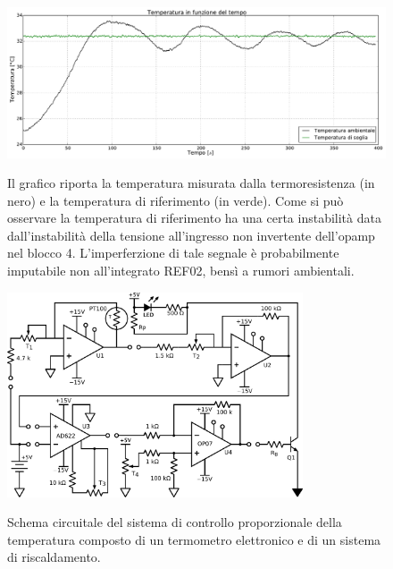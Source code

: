 \begin{figure}[ht]
 \centering
   {\includegraphics[width=1\textwidth]{../E06/latex/grafico.pdf}}
 \caption{Il grafico riporta la temperatura misurata dalla termoresistenza (in nero) e la temperatura di riferimento (in verde). Come si può osservare la temperatura di riferimento ha una certa instabilità data dall'instabilità della tensione all'ingresso non invertente dell'opamp nel blocco 4. L'imperferzione di tale segnale è probabilmente imputabile non all'integrato REF02, bensì a rumori ambientali.}
 \label{gr6:grafico}
\end{figure}

\begin{figure}[htc!]
 \centering
   {\includegraphics[width=0.78\textwidth]{../E06/latex/c2.pdf}}%
 \caption{Schema circuitale del sistema di controllo proporzionale della temperatura composto di un termometro elettronico e di un sistema di riscaldamento.}
 \label{gr6:proporzionale}
\end{figure}
